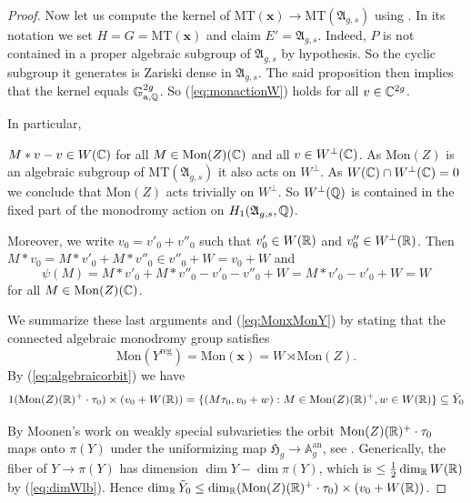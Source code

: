 \documentclass[12pt,oneside]{amsart}
\begin{document}
\begin{proof}
  Now let us compute the kernel of
  $\mathrm{MT}(\mathbf{x})\rightarrow
  \mathrm{MT}(\mathfrak{A}_{g,s})$ using  \cite[Proposition 1]{Andre92}. In its notation we set
  $H=G=\mathrm{MT}(\mathbf{x})$ and claim $E' = \mathfrak{A}_{g,s}$.
  Indeed, $P$ is not contained in a proper algebraic subgroup of
  $\mathfrak{A}_{g,s}$ by hypothesis. So the cyclic subgroup it
  generates is Zariski dense in $\mathfrak{A}_{g,s}$. The said
  proposition then implies that the kernel equals ${\mathbb{G}}_{\mathrm{a},{\mathbb{Q}}}^{2g}$.
  So (\ref{eq:monactionW}) holds for all $v\in{\mathbb{C}}^{2g}$. 

  In particular,

  $M*v-v\in W({\mathbb{C}})$ for all $M\in \mathrm{Mon}(Z)({\mathbb{C}})$
  and all $v\in W^\perp({\mathbb{C}})$. As $\mathrm{Mon}(Z)$ is an algebraic
  subgroup of $\mathrm{MT}(\mathfrak{A}_{g,s})$ it also acts on
  $W^\perp$. As $W({\mathbb{C}})\cap W^{\perp}({\mathbb{C}})=0$ we conclude that
  $\mathrm{Mon}(Z)$ acts trivially on $W^{\perp}$. So $W^{\perp}({\mathbb{Q}})$
  is contained in the fixed part of the monodromy action on
  $H_1(\mathfrak{A}_{g,s},{\mathbb{Q}})$.

  Moreover, we write $v_0 = v'_0+v''_0$ such that $v'_0\in W({\mathbb{R}})$
  and $v''_0\in W^\perp({\mathbb{R}})$. Then
  $M*v_0 = M*v'_0+M*v''_0 \in v''_0+ W=v_0 + W$ and
  \begin{equation*}
    \psi(M) = M*v'_0+M*v''_0 - v'_0 -v''_0 + W = M*v'_0 - v'_0 + W = W
  \end{equation*}
  for all $M\in \mathrm{Mon}(Z)({\mathbb{C}})$. 

 
  We summarize these last arguments and (\ref{eq:MonxMonY}) by stating that the connected algebraic monodromy group satisfies
  \begin{equation*}
     \mathrm{Mon}(Y^{\mathrm{reg}})=
    \mathrm{Mon}(\mathbf{x})
    =W\rtimes \mathrm{Mon}(Z).
  \end{equation*}
  By (\ref{eq:algebraicorbit}) we have
  \scriptsize
  \begin{alignat*}1
    (\mathrm{Mon}(Z)(\IR)^+\cdot\tau_0)\times (v_0+W(\IR))=\{(M\tau_0,v_0+w) : M\in \mathrm{Mon}(Z)(\IR)^+, w\in W(\IR)\}
    \subset \tilde Y_0 %
  \end{alignat*}
  \normalsize
  
  By Moonen's work on weakly special subvarieties the orbit
  $\mathrm{Mon}(Z)({\mathbb{R}})^+\cdot \tau_0$ maps onto $\pi(Y)$ under the
  uniformizing map $\mathfrak{H}_g
  \rightarrow\mathbb{A}_g^{\mathrm{an}}$, see \cite[$\mathsection$3 and
  Proposition~3.7]{Moonen}. Generically, the fiber of
  $Y\rightarrow\pi(Y)$ has dimension $\dim Y-\dim\pi(Y)$, which is $\le
  \frac 12 \dim_{{\mathbb{R}}} W({\mathbb{R}})$ by (\ref{eq:dimWlb}). Hence
  $\dim_{{\mathbb{R}}}\tilde{Y}_0 \le \dim_{\mathbb{R}}(
\mathrm{Mon}(Z)({\mathbb{R}})^+\cdot\tau_0)\times (v_0+W({\mathbb{R}}))$.


\end{proof}
\end{document}
